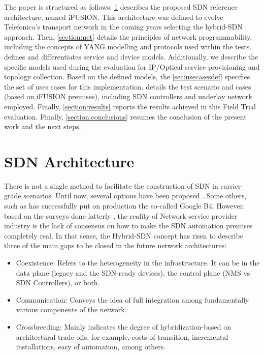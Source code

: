\documentclass[a4paper,fleqn]{cas-dc}
\begin{document}
The paper is structured as follows: \cref{section:arq} describes the proposed SDN reference architecture, named iFUSION. This architecture was defined to evolve Telefonica's transport network in the coming years selecting the hybrid-SDN approach. Then, \cref{section:net} details the principles of network programmability, including the concepts of YANG modelling and protocols used within the tests.  defines and differentiates service and device models. Additionally, we describe the specific models used during the evaluation for IP/Optical service provisioning and topology collection. Based on the defined models, the \cref{sec:usecasesdef} specifies the set of uses cases for this implementation.  details the test scenario and cases (based on iFUSION premises), including SDN controllers and underlay network employed. Finally, \cref{section:results} reports the results achieved in this Field Trial evaluation. Finally, \cref{section:conclusions} resumes the conclusion of the present work and the next steps.

\section{SDN Architecture}
\label{section:arq}

There is not a single method to facilitate the construction of SDN in carrier-grade scenarios. Until now, several options have been proposed \cite{bakshi2013considerations,karakus2017survey,birk2016evolving}. Some others, such as \cite{jain2013b4} has successfully put on production the so-called Google B4. However, based on the surveys done latterly \cite{campbell1999survey,sinha2017survey,boucadair2014software}, the reality of Network service provider industry is the lack of consensus on how to make the SDN automation premises completely real. In that sense, the Hybrid-SDN concept has risen to describe three of the main gaps to be closed in the future network architectures:
\begin{itemize}
    \item Coexistence: Refers to the heterogeneity in the infrastructure. It can be in the data plane (legacy and the SDN-ready devices), the control plane (NMS vs SDN Controllers), or both. 
    \item Communication: Conveys the idea of full integration among fundamentally various components of the network.
    \item Crossbreeding: Mainly indicates the degree of hybridization-based on architectural trade-offs, for example, costs of transition, incremental installations, easy of automation, among others. 
\end{itemize}
\end{document}
